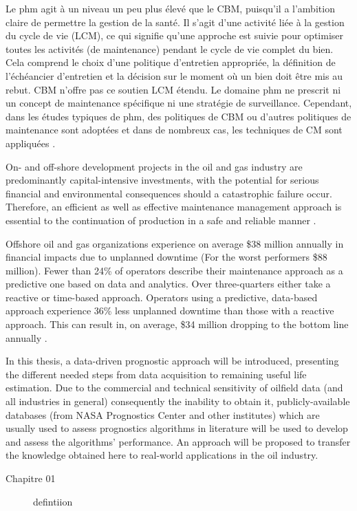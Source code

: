 Le \acrshort{phm} agit à un niveau un peu plus élevé que le CBM, puisqu’il a l’ambition claire de permettre la gestion de la santé. Il s’agit d’une activité liée à la gestion du cycle de vie (LCM), ce qui signifie qu’une approche est suivie pour optimiser toutes les activités (de maintenance) pendant le cycle de vie complet du bien. Cela comprend le choix d’une politique d’entretien appropriée, la définition de l'échéancier d’entretien et la décision sur le moment où un bien doit être mis au rebut. CBM n’offre pas ce soutien LCM étendu. Le domaine \acrshort{phm} ne prescrit ni un concept de maintenance spécifique ni une stratégie de surveillance. Cependant, dans les études typiques de \acrshort{phm}, des politiques de CBM ou d’autres politiques de maintenance sont adoptées et dans de nombreux cas, les techniques de CM sont appliquées \cite{Tinga2014}.



On- and off-shore development projects in the oil and gas industry are predominantly capital-intensive investments, with the potential for serious financial and environmental consequences should a catastrophic failure occur. Therefore, an efficient as well as effective maintenance management approach is essential to the continuation of production in a safe and reliable manner \cite{Telford2011}.

Offshore oil and gas organizations experience on average \$38 million annually in financial impacts due to unplanned
downtime (For the worst performers \$88 million). Fewer than 24\% of operators describe their maintenance approach as a predictive one based on data and analytics. Over three-quarters either take a reactive or time-based approach. Operators using a predictive, data-based approach experience 36\% less unplanned downtime than those with a reactive approach. This can result in, on average, \$34 million dropping to the bottom line annually \cite{Eriksen2016}.

In this thesis, a data-driven prognostic approach will be introduced, presenting the different needed steps from data acquisition to remaining useful life estimation. Due to the commercial and technical sensitivity of oilfield data (and all industries in general) consequently the inability to obtain it, publicly-available databases (from NASA Prognostics Center and other institutes) which are usually used to assess prognostics algorithms in literature will be used to develop and assess the algorithms' performance. An approach will be proposed to transfer the knowledge obtained here to real-world applications in the oil industry.
\newline
\begin{description}
	\item[Chapitre 01] defintiion
\end{description}




